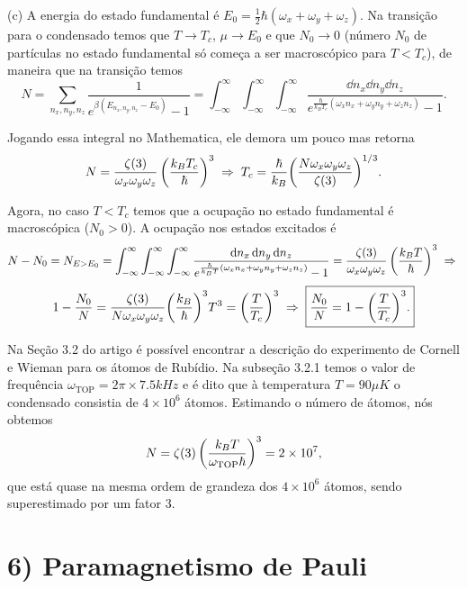 \documentclass[a4paper,10pt]{article}
\begin{document}
\n\n

(c) A energia do estado fundamental é $E_0 = \frac{1}{2} \hbar (\omega_x + \omega_y + \omega_z)$. Na transição para o condensado temos que $T \to T_c$, $\mu \to E_0$ e que $N_0 \to 0$ (número $N_0$ de partículas no estado fundamental só começa a ser macroscópico para $T < T_c$), de maneira que na transição temos
$$
N = \sum_{n_x, n_y, n_z} \frac{1}{e^{\beta(E_{n_x,n_y,n_z} - E_0)} - 1} =
\int_{-\infty}^{\infty} \int_{-\infty}^{\infty} \int_{-\infty}^{\infty}
\frac{\dd{n_x} \dd{n_y} \dd{n_z}}{e^{\frac{\hbar}{k_B T_c}(\omega_x n_x + \omega_y n_y + \omega_z n_z)} - 1}.
$$

Jogando essa integral no Mathematica, ele demora um pouco mas retorna
$$
N = \frac{\zeta(3)}{\omega_x \omega_y \omega_z} \, \qty(\frac{k_B T_c}{\hbar})^3 \; \Rightarrow \;
T_c = \frac{\hbar}{k_B} \qty(\frac{N \omega_x \omega_y \omega_z}{\zeta(3)})^{1/3}.
$$

Agora, no caso $T < T_c$ temos que a ocupação no estado fundamental é macroscópica ($N_0 > 0$). A ocupação nos estados excitados é
$$
N - N_0 = N_{E > E_0} = \int_{-\infty}^{\infty} \int_{-\infty}^{\infty} \int_{-\infty}^{\infty}
\frac{\dd{n_x} \dd{n_y} \dd{n_z}}{e^{\frac{\hbar}{k_B T}(\omega_x n_x + \omega_y n_y + \omega_z n_z)} - 1} =
\frac{\zeta(3)}{\omega_x \omega_y \omega_z} \, \qty(\frac{k_B T}{\hbar})^3 \; \Rightarrow \;
$$
$$
1 - \frac{N_0}{N} = \frac{\zeta(3)}{N \omega_x \omega_y \omega_z} \qty(\frac{k_B}{\hbar})^3 T^3 = \qty(\frac{T}{T_c})^3
\; \Rightarrow \; \boxed{ \frac{N_0}{N} = 1 - \qty(\frac{T}{T_c})^3. }
$$

\n

Na Seção 3.2 do artigo \cite{courteille2001} é possível encontrar a descrição do experimento de Cornell e Wieman para os átomos de Rubídio. Na subseção 3.2.1 temos o valor de frequência $\omega_{\text{TOP}} = 2\pi \times 7.5 \unit{kHz}$ e é dito que à temperatura $T = 90 \unit{\mu K}$ o condensado consistia de $4 \times 10^6$ átomos. Estimando o número de átomos, nós obtemos
$$
N = \zeta(3) \, \qty(\frac{k_B T}{\omega_{\text{TOP}} \hbar})^3 = 2 \times 10^7,
$$
que está quase na mesma ordem de grandeza dos $4 \times 10^6$ átomos, sendo superestimado por um fator $3$.


%






\pagebreak

\section*{6) Paramagnetismo de Pauli}
\end{document}
